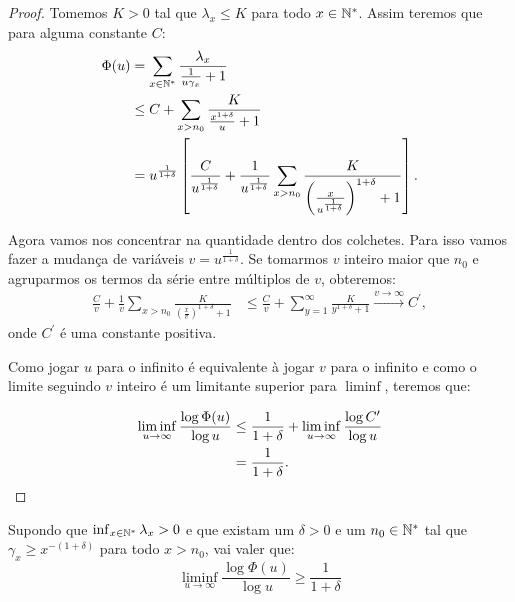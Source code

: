 \begin{proof}
  Tomemos $K > 0$ tal que $\lambda_x \leq K$ para todo $x \in
  {\mathbb{N^*}}$. Assim teremos que para alguma constante $C$:
  \begin{align*}
    \Phi(u) &= \sum_{x \in {\mathbb{N^*}}} \frac{\lambda_x}{\frac{1}{u\gamma_x} +
      1}\\
    &\leq C + \sum_{x > n_0} \frac{K}{\frac{x^{1+\delta}}{u} + 1}\\
    &=u^{\frac{1}{1+\delta}} \left[
      \frac{C}{u^{\frac{1}{1+\delta}}} +
      \frac{1}{u^{\frac{1}{1+\delta}}} \sum_{x > n_0} \frac{K}{
        \left( \frac{x}{u^{\frac{1}{1+\delta}}}  \right)^{1+\delta}
        + 1
      }
    \right].
  \end{align*}

  Agora vamos nos concentrar na quantidade dentro dos colchetes. Para
  isso vamos fazer a mudança de variáveis $v =
  u^{\frac{1}{1+\delta}}$. Se tomarmos $v$ inteiro maior que $n_0$ e
  agruparmos os termos da série entre múltiplos de $v$, obteremos:
  \begin{align*}
    \frac{C}{v} + \frac{1}{v} \sum_{x > n_0} \frac{K}{ \left(
        \frac{x}{v} \right)^{1+\delta} + 1 }
    &\leq
    \frac{C}{v} + \sum_{y=1}^{\infty} \frac{K}{y^{1+\delta} + 1}
    \xrightarrow{v \to \infty} C^\prime,
  \end{align*}
  onde $C^\prime$ é uma constante positiva.

  Como jogar $u$ para o infinito é equivalente à jogar $v$ para o
  infinito e como o limite seguindo $v$ inteiro é um limitante
  superior para $\liminf$, teremos que:

  \begin{align*}
    \liminf_{u \to \infty} \frac{\log \Phi(u)}{\log u} &\leq
    \frac{1}{1+\delta} + \liminf_{u \to \infty} 
    \frac{\log{C^\prime}}{\log u}\\
    &= \frac{1}{1+\delta}.
    \qedhere
  \end{align*}
\end{proof}

\begin{proposicao}
\label{prop:dominar-dim-haus-inf}
  Supondo que $\inf_{x\in{\mathbb{N^*}}}\lambda_x  > 0$ e que existam um
  $\delta>0$ e um $n_0 \in {\mathbb{N^*}}$ tal que $\gamma_x \geq x^{-(1+\delta)}$
  para todo $x > n_0$, vai valer que:
  \begin{equation}
    \liminf_{u \to \infty} \frac{\log \Phi(u)}{\log u}  \geq \frac{1}{1+\delta}
  \end{equation}
\end{proposicao}

